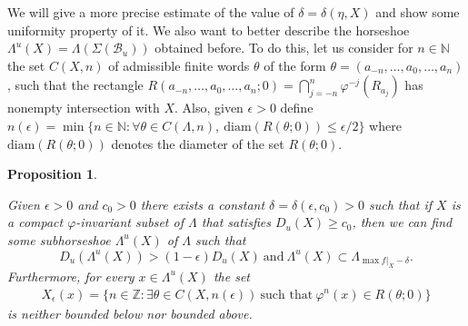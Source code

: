 \documentclass[12pt]{amsart}
\theoremstyle{plain} %
\newtheorem{proposition}[theorem]{Proposition}
\theoremstyle{definition} %
\numberwithin{equation}{section}
\begin{document}
We will give a more precise estimate of the value of $\delta=\delta(\eta,X)$ and show some uniformity property of it. We also want to better describe the horseshoe $\Lambda ^u(X)=\Lambda(\Sigma(\mathcal{B}_u))$ obtained before. To do this, let us consider for $n\in \mathbb{N}$ the set $C(X,n)$ of admissible finite words $\theta$ of the form $\theta=(a_{-n},\dots,a_0,\dots, a_{n})$, such that the rectangle $R(a_{-n},\dots,a_0,\dots, a_{n};0)=\bigcap\limits_{j=-n}^{n}\varphi^{-j}(R_{a_j})$ has nonempty intersection with $X$. Also, given $\epsilon>0$ define $n(\epsilon)=\min\{n\in\mathbb{N}:\forall \theta\in C(\Lambda,n), \  \text{diam}(R(\theta;0))\leq \epsilon/2 \}$ where $\text{diam}(R(\theta;0))$ denotes the diameter of the set $R(\theta;0)$. 

\begin{proposition}\label{mcu2}

Given $\epsilon >0$ and $c_0 >0$ there exists a constant $\delta=\delta(\epsilon, c_0)>0$ such that if $X$ is a compact $\varphi$-invariant subset of $\Lambda$ that satisfies $D_u(X) \geq c_0$, then we can find some subhorseshoe $\Lambda ^u(X)$ of $\Lambda$ such that 
$$D_u(\Lambda ^u(X))>(1-\epsilon)D_u(X)\ \text{and}\ \Lambda ^u(X)\subset \Lambda_{\max f|_X-\delta}.$$ 
Furthermore, for every $x\in \Lambda ^u(X)$ the set
 \begin{eqnarray*}
X_\epsilon(x)=\{n\in \mathbb{Z}: \exists \theta\in C(X,n(\epsilon))\ \mbox{such that}\ \varphi^n(x)\in R(\theta;0)\}
\end{eqnarray*} 
is neither bounded below nor bounded above.
\end{proposition}
\end{document}

